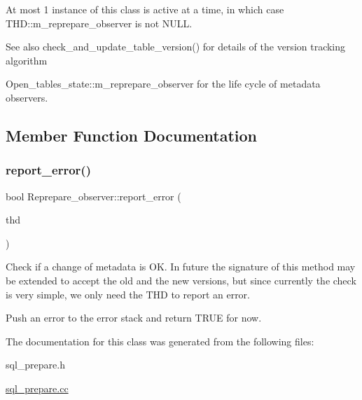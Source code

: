 At most 1 instance of this class is active at a time, in which case T\+H\+D\+::m\+\_\+reprepare\+\_\+observer is not N\+U\+LL.

\begin{DoxySeeAlso}{See also}
check\+\_\+and\+\_\+update\+\_\+table\+\_\+version() for details of the version tracking algorithm

Open\+\_\+tables\+\_\+state\+::m\+\_\+reprepare\+\_\+observer for the life cycle of metadata observers. 
\end{DoxySeeAlso}


\subsection{Member Function Documentation}
\mbox{\label{classReprepare__observer_a46318688ac06952559ad6f60a5a1cd53}} 
\subsubsection{\texorpdfstring{report\+\_\+error()}{report\_error()}}
{\footnotesize\ttfamily bool Reprepare\+\_\+observer\+::report\+\_\+error (\begin{DoxyParamCaption}\item[{T\+HD $\ast$}]{thd }\end{DoxyParamCaption})}

Check if a change of metadata is OK. In future the signature of this method may be extended to accept the old and the new versions, but since currently the check is very simple, we only need the T\+HD to report an error.

Push an error to the error stack and return T\+R\+UE for now. 

The documentation for this class was generated from the following files\+:\begin{DoxyCompactItemize}
\item 
sql\+\_\+prepare.\+h\item 
\mbox{\hyperlink{sql__prepare_8cc}{sql\+\_\+prepare.\+cc}}\end{DoxyCompactItemize}
